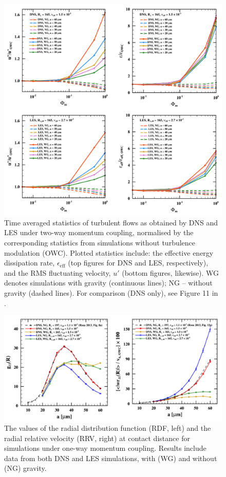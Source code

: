 \begin{figure}
\centering
\includegraphics[width=13.5cm]{figures/2-05_modstat.pdf}
\caption{
Time averaged statistics of turbulent flows as obtained by DNS and LES under two-way momentum coupling, normalised by the corresponding statistics from simulations without turbulence modulation (OWC).
Plotted statistics include: the effective energy dissipation rate, $\epsilon_{\text{eff}}$ (top figures for DNS and LES, respectively), and the RMS fluctuating velocity, $u'$ (bottom figures, likewise).
WG denotes simulations with gravity (continuous lines); NG -- without gravity (dashed lines).
For comparison (DNS only), see Figure 11 in \textcite{Rosa2020}.
}
\label{fig:modstat}
\end{figure}


\begin{figure}
\centering
\includegraphics[width=13.5cm]{figures/2-06_owcrdfrrv.pdf}
\caption{
The values of the radial distribution function (RDF, left) and the radial relative velocity (RRV, right) at contact distance for simulations under one-way momentum coupling.
Results include data from both DNS and LES simulations, with (WG) and without (NG) gravity.
}
\label{fig:owcrdfrrv}
\end{figure}

